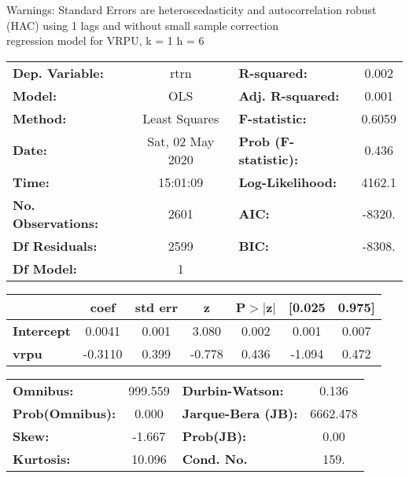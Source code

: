 Warnings: \newline
 [1] Standard Errors are heteroscedasticity and autocorrelation robust (HAC) using 1 lags and without small sample correction\\ 

regression model for VRPU, k = 1 h = 6\begin{center}
\begin{tabular}{lclc}
\toprule
\textbf{Dep. Variable:}    &       rtrn       & \textbf{  R-squared:         } &     0.002   \\
\textbf{Model:}            &       OLS        & \textbf{  Adj. R-squared:    } &     0.001   \\
\textbf{Method:}           &  Least Squares   & \textbf{  F-statistic:       } &    0.6059   \\
\textbf{Date:}             & Sat, 02 May 2020 & \textbf{  Prob (F-statistic):} &    0.436    \\
\textbf{Time:}             &     15:01:09     & \textbf{  Log-Likelihood:    } &    4162.1   \\
\textbf{No. Observations:} &        2601      & \textbf{  AIC:               } &    -8320.   \\
\textbf{Df Residuals:}     &        2599      & \textbf{  BIC:               } &    -8308.   \\
\textbf{Df Model:}         &           1      & \textbf{                     } &             \\
\bottomrule
\end{tabular}
\begin{tabular}{lcccccc}
                   & \textbf{coef} & \textbf{std err} & \textbf{z} & \textbf{P$> |$z$|$} & \textbf{[0.025} & \textbf{0.975]}  \\
\midrule
\textbf{Intercept} &       0.0041  &        0.001     &     3.080  &         0.002        &        0.001    &        0.007     \\
\textbf{vrpu}      &      -0.3110  &        0.399     &    -0.778  &         0.436        &       -1.094    &        0.472     \\
\bottomrule
\end{tabular}
\begin{tabular}{lclc}
\textbf{Omnibus:}       & 999.559 & \textbf{  Durbin-Watson:     } &    0.136  \\
\textbf{Prob(Omnibus):} &   0.000 & \textbf{  Jarque-Bera (JB):  } & 6662.478  \\
\textbf{Skew:}          &  -1.667 & \textbf{  Prob(JB):          } &     0.00  \\
\textbf{Kurtosis:}      &  10.096 & \textbf{  Cond. No.          } &     159.  \\
\bottomrule
\end{tabular}
\end{center}

